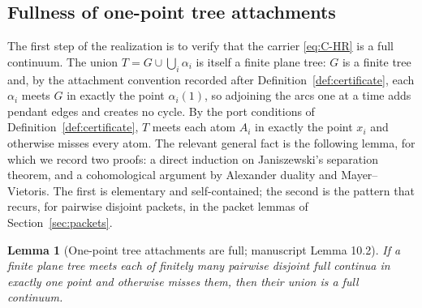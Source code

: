 \documentclass[11pt,reqno]{amsart}
\newtheorem{lemma}[theorem]{Lemma}
\theoremstyle{definition}
\theoremstyle{remark}
\begin{document}
\subsection*{Fullness of one-point tree attachments}
The first step of the realization is to verify that the carrier
\eqref{eq:C-HR} is a full continuum.  The union
$T=G\cup\bigcup_i\alpha_i$ is itself a finite plane tree: $G$ is a finite
tree and, by the attachment convention recorded after
Definition~\ref{def:certificate}, each $\alpha_i$ meets $G$ in exactly
the point $\alpha_i(1)$, so adjoining the arcs one at a time adds pendant
edges and creates no cycle.  By the port conditions of
Definition~\ref{def:certificate}, $T$ meets each atom $A_i$ in exactly the
point $x_i$ and otherwise misses every atom.  The relevant general fact is
the following lemma, for which we record two proofs: a direct induction on
Janiszewski's separation theorem, and a cohomological argument by
Alexander duality and Mayer--Vietoris.  The first is elementary and
self-contained; the second is the pattern that recurs, for pairwise
disjoint packets, in the packet lemmas of Section~\ref{sec:packets}.

\begin{lemma}[One-point tree attachments are full; manuscript Lemma 10.2]
\label{lem:tree-full}
If a finite plane tree meets each of finitely many pairwise disjoint full
continua in exactly one point and otherwise misses them, then their union
is a full continuum.
\end{lemma}
\end{document}
